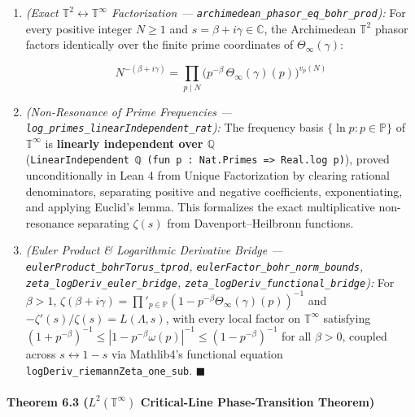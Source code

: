 \documentclass[
  11pt,
]{article}
\begin{document}
\begin{enumerate}
\def\labelenumi{\arabic{enumi}.}
\item
  \emph{(Exact \(\mathbb{T}^2 \leftrightarrow \mathbb{T}^\infty\)
  Factorization --- \texttt{archimedean\_phasor\_eq\_bohr\_prod}):} For
  every positive integer \(N \ge 1\) and
  \(s = \beta + i\gamma \in \mathbb{C}\), the Archimedean
  \(\mathbb{T}^2\) phasor factors identically over the finite prime
  coordinates of \(\Theta_\infty(\gamma)\):

  \[N^{-(\beta + i\gamma)} = \prod_{p \mid N} \Big(p^{-\beta}\,\Theta_\infty(\gamma)(p)\Big)^{v_p(N)}\]
\item
  \emph{(Non-Resonance of Prime Frequencies ---
  \texttt{log\_primes\_linearIndependent\_rat}):} The frequency basis
  \(\{\ln p : p \in \mathbb{P}\}\) of \(\mathbb{T}^\infty\) is
  \textbf{linearly independent over \(\mathbb{Q}\)}
  (\texttt{LinearIndependent\ ℚ\ (fun\ p\ :\ Nat.Primes\ =\textgreater{}\ Real.log\ p)}),
  proved unconditionally in Lean 4 from Unique Factorization by clearing
  rational denominators, separating positive and negative coefficients,
  exponentiating, and applying Euclid's lemma. This formalizes the exact
  multiplicative non-resonance separating \(\zeta(s)\) from
  Davenport--Heilbronn functions.
\item
  \emph{(Euler Product \& Logarithmic Derivative Bridge ---
  \texttt{eulerProduct\_bohrTorus\_tprod},
  \texttt{eulerFactor\_bohr\_norm\_bounds},
  \texttt{zeta\_logDeriv\_euler\_bridge},
  \texttt{zeta\_logDeriv\_functional\_bridge}):} For \(\beta > 1\),
  \(\zeta(\beta + i\gamma) = \prod'_{p \in \mathbb{P}} (1 - p^{-\beta}\Theta_\infty(\gamma)(p))^{-1}\)
  and \(-\zeta'(s)/\zeta(s) = L(\Lambda, s)\), with every local factor
  on \(\mathbb{T}^\infty\) satisfying
  \((1 + p^{-\beta})^{-1} \le |1 - p^{-\beta}\omega(p)|^{-1} \le (1 - p^{-\beta})^{-1}\)
  for all \(\beta > 0\), coupled across \(s \leftrightarrow 1 - s\) via
  Mathlib4's functional equation
  \texttt{logDeriv\_riemannZeta\_one\_sub}. \(\blacksquare\)
\end{enumerate}

\paragraph{\texorpdfstring{Theorem 6.3 (\(L^2(\mathbb{T}^\infty)\)
Critical-Line Phase-Transition
Theorem)}{Theorem 6.3 (L\^{}2(\textbackslash mathbb\{T\}\^{}\textbackslash infty) Critical-Line Phase-Transition Theorem)}}\label{theorem-6.3-l2mathbbtinfty-critical-line-phase-transition-theorem}
\end{document}
